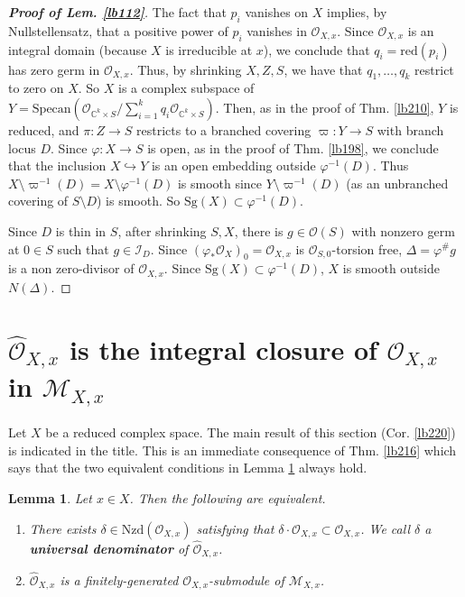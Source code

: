 \documentclass[12pt,b5paper,notitlepage]{report}
\theoremstyle{definition}
\theoremstyle{plain}
\newtheorem{lm}[df]{Lemma}
\newcommand{\scr}{\mathscr}
\newcommand{\Cbb}{\mathbb C}
\newcommand{\Specan}{\mathrm{Specan}}
\newcommand{\red}{\mathrm{red}}
\newcommand{\Sg}{\mathrm{Sg}}
\newcommand{\Nzd}{\mathrm{Nzd}}
\newcommand{\Owht}{\widehat{\scr O}}
\numberwithin{equation}{section}
\begin{document}
\begin{proof}[\textbf{Proof of Lem. \ref{lb112}}]
The fact that $p_i$ vanishes on $X$ implies, by Nullstellensatz, that a positive power of $p_i$ vanishes in $\scr O_{X,x}$. Since $\scr O_{X,x}$ is an integral domain (because $X$ is irreducible at $x$), we conclude that $q_i=\red(p_i)$ has zero germ in $\scr O_{X,x}$. Thus, by shrinking $X,Z,S$, we have that $q_1,\dots,q_k$ restrict to zero on $X$. So $X$ is a complex subspace of $Y=\Specan(\scr O_{\Cbb^k\times S}/\sum_{i=1}^k q_i\scr O_{\Cbb^k\times S})$. Then, as in the proof of Thm. \ref{lb210}, $Y$ is reduced, and $\pi:Z\rightarrow S$ restricts to a branched covering $\varpi:Y\rightarrow S$ with branch locus $D$. Since $\varphi:X\rightarrow S$ is open, as in the proof of Thm. \ref{lb198}, we conclude that the inclusion $X\hookrightarrow Y$ is an open embedding outside $\varphi^{-1}(D)$. Thus $X\setminus\varpi^{-1}(D)=X\setminus\varphi^{-1}(D)$ is smooth since $Y\setminus\varpi^{-1}(D)$ (as an unbranched covering of $S\setminus D$) is smooth. So $\Sg(X)\subset\varphi^{-1}(D)$.

Since $D$ is thin in $S$, after shrinking $S,X$, there is $g\in\scr O(S)$ with nonzero germ at $0\in S$ such that $g\in\scr I_D$. Since $(\varphi_*\scr O_X)_0=\scr O_{X,x}$ is $\scr O_{S,0}$-torsion free, $\varDelta=\varphi^\# g$ is a non zero-divisor of $\scr O_{X,x}$. Since $\Sg(X)\subset\varphi^{-1}(D)$, $X$ is smooth outside $N(\varDelta)$. 
\end{proof}












\section{$\Owht_{X,x}$ is the integral closure of $\scr O_{X,x}$ in $\scr M_{X,x}$}

Let $X$ be a reduced complex space. The main result of this section (Cor. \ref{lb220}) is indicated in the title. This is an immediate consequence of Thm. \ref{lb216} which says that the two equivalent conditions in Lemma \ref{lb212} always hold.


\begin{lm}\label{lb212}
Let $x\in X$. Then the following are equivalent.
\begin{enumerate}[label=(\arabic*)]
\item There exists $\delta\in\Nzd(\scr O_{X,x})$ satisfying that $\delta\cdot\Owht_{X,x}\subset\scr O_{X,x}$. We call $\delta$ a \textbf{universal denominator}  of $\Owht_{X,x}$.
\item $\Owht_{X,x}$ is a finitely-generated $\scr O_{X,x}$-submodule of $\scr M_{X,x}$.
\end{enumerate}
\end{lm}
\end{document}
